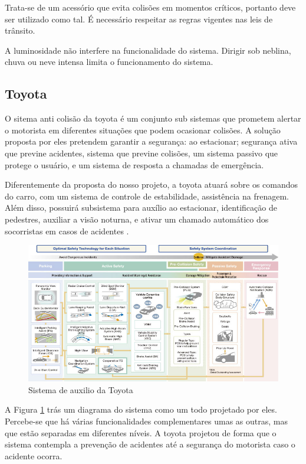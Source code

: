 Trata-se de um acessório que evita colisões em momentos críticos, portanto deve ser utilizado como tal. É necessário respeitar as regras vigentes nas leis de trânsito.

A luminosidade não interfere na funcionalidade do sistema. Dirigir sob neblina, chuva ou neve intensa limita o funcionamento do sistema.

\subsection{Toyota}
O sitema anti colisão da toyota é um conjunto sub sistemas que prometem alertar o motorista em diferentes situações que podem ocasionar colisões. A solução proposta por eles pretendem garantir a segurança: ao estacionar; segurança ativa que previne acidentes, sistema que previne colisões, um sistema passivo que protege o usuário, e um sistema de resposta a chamadas de emergência.

Diferentemente da proposta do nosso projeto, a toyota atuará sobre os comandos do carro, com um sistema de controle de estabilidade, assistência na frenagem. Além disso, possuirá subsistema para auxílio ao estacionar, identificação de pedestres, auxiliar a visão noturna, e ativar um chamado automático dos socorristas em casos de acidentes \cite{toyota}.

\begin{figure}[h]
  \centering
  \includegraphics[width=450px, scale=0.5]{figuras/sistematoyota}
  \caption{Sistema de auxilio da Toyota}
  \label{fig:sistematoyota}
\end{figure}

A Figura \ref{fig:sistematoyota} trás um diagrama do sistema como um todo projetado por eles. Percebe-se que há várias funcionalidades complementares umas as outras, mas que estão separadas em diferentes níveis. A toyota projetou de forma que o sistema contempla a prevenção de acidentes até a segurança do motorista caso o acidente ocorra.

